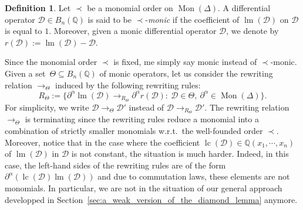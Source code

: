\documentclass[10pt]{easychair}
\theoremstyle{definition}
\newtheorem{definition}[theorem]{Definition}
\newcommand\D{\mathcal{D}}
\DeclareMathOperator{\lm}{lm}
\DeclareMathOperator{\lc}{lc}
\newcommand\Q{\mathbb{Q}}
\newcommand\QXX{\mathbb{Q}(x_1,\cdots,x_n)}
\newcommand\Weyl[1]{B_{#1}(\Q)}
\newcommand\monBasis{\Mon(\Delta)}
\DeclareMathOperator{\Mon}{Mon}
\newcommand\rewTheta{\to_\Theta}
\newcommand\RTheta{R_{\Theta}}
\begin{document}
\begin{definition}
  Let $\prec$ be a monomial order on $\monBasis$. A differential
  operator $\D\in\Weyl{n}$ is said to be $\prec$-{\em monic} if the
  coefficient of $\lm(\D)$ on $\D$ is equal to $1$. Moreover, given a
  monic differential operator $\D$, we denote by $r(\D):=\lm(\D)-\D$.
\end{definition}
\smallskip

Since the monomial order $\prec$ is fixed, me simply say monic instead of
$\prec$-monic. Given a set~$\Theta\subseteq\Weyl{n}$ of monic operators,
let us consider the rewriting relation $\rewTheta$ induced by the
following rewriting rules: 
\begin{equation}\label{equ:rewTheta}
  \RTheta:=\Big\{\partial^\alpha\lm(\D)\to_{\RTheta}\partial^\alpha
  r(\D):\ \D\in\Theta,\ \partial^\alpha\in\Mon(\Delta)\Big\}.
\end{equation}
For simplicity, we write $\D\rewTheta\D'$ instead of
$\D\to_{R_\Theta}\D'$. The rewriting relation $\rewTheta$ is terminating
since the rewriting rules reduce a monomial into a combination of
strictly smaller monomials w.r.t.\ the well-founded order $\prec$.
Moreover, notice that in the case where the coefficient $\lc(\D)\in\QXX$
of $\lm(\D)$ in $\D$ is not constant, the situation is much harder.
Indeed, in this case, the left-hand sides of the rewriting rules are of
the form $\partial^\alpha(\lc(\D)\lm(\D))$ and due to commutation laws,
these elements are not monomials. In particular, we are not in the
situation of our general approach developped in  
Section~\ref{sec:a_weak_version_of_the_diamond_lemma} anymore.
\medskip
\end{document}
